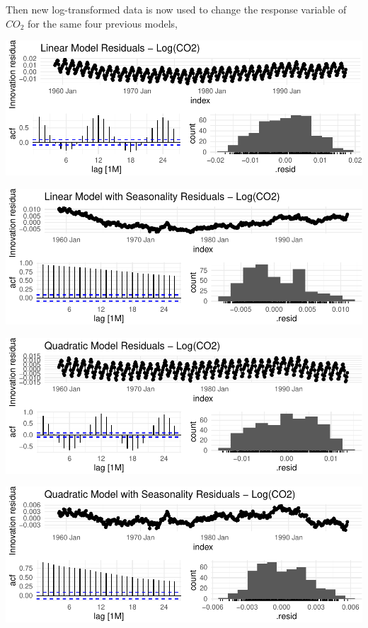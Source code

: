 \documentclass[AER]{AEA}
\begin{document}
Then new log-transformed data is now used to change the response
variable of \(CO_2\) for the same four previous models,

\includegraphics{co2_1997_Qian_files/figure-latex/linear log models, -1.pdf}

\includegraphics{co2_1997_Qian_files/figure-latex/linear seasonal log transform-1.pdf}

\includegraphics{co2_1997_Qian_files/figure-latex/quad log transform-1.pdf}

\includegraphics{co2_1997_Qian_files/figure-latex/quad seasonal log transform-1.pdf}
\end{document}
